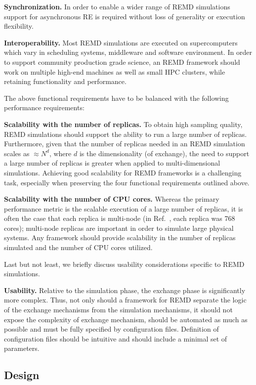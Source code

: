 \documentclass{sig-alternate-05-2015}
\begin{document}
\textbf{Synchronization.} In order to enable a wider range of REMD simulations support for asynchronous RE is required without loss of generality or execution flexibility. 



\textbf{Interoperability.} Most REMD simulations are executed on supercomputers which vary in scheduling systems, middleware and software environment. In order to support community production grade science, an REMD framework should work on multiple high-end machines as well as small HPC clusters, while retaining functionality and performance.

The above functional requirements have to be balanced with the following performance requirements:

\textbf{Scalability with the number of replicas.} To obtain high sampling quality, REMD simulations should support the ability to run a large number of replicas. Furthermore, given that the number of replicas needed in an REMD simulation scales as $\approx N^d$, where $d$ is the dimensionality (of exchange), the need to support a large number of replicas is greater when applied to multi-dimensional simulations. Achieving good scalability for REMD frameworks is a challenging task, especially when preserving the four functional requirements outlined above.

\textbf{Scalability with the number of CPU cores.}  Whereas the primary performance metric is the scalable execution of a large number of replicas, it is often the case that each replica is multi-node (in Ref.~\cite{swadling2015structure}, each replica was 768 cores); multi-node replicas are important in order to simulate large physical systems.  Any framework should provide scalability in the number of replicas simulated and the number of CPU cores utilized.


Last but not least, we briefly discuss usability considerations specific to REMD simulations.
  
\textbf{Usability.} Relative to the simulation phase, the exchange phase is significantly more complex. Thus, not only should a framework for REMD separate the logic of the exchange mechanisms from the simulation mechanisms, it should not expose the complexity of exchange mechanism, should be automated as much as possible and must be fully specified by configuration files. Definition of configuration files should be intuitive and should include a minimal set of parameters.

\subsection{Design} \label{design} 
\end{document}
